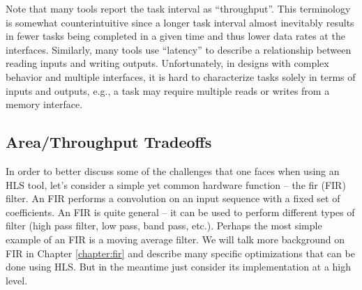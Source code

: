 \begin{aside}
Note that many tools report the task interval as ``throughput''. This terminology is somewhat counterintuitive since a longer task interval almost inevitably results in fewer tasks being completed in a given time and thus lower data rates at the interfaces.  Similarly, many tools use ``latency'' to describe a relationship between reading inputs and writing outputs.  Unfortunately, in designs with complex behavior and multiple interfaces, it is hard to characterize tasks solely in terms of inputs and outputs, e.g., a task may require multiple reads or writes from a memory interface. 
\end{aside}




\subsection{Area/Throughput Tradeoffs}
\label{sec:filterThroughputTradeoffs}

In order to better discuss some of the challenges that one faces when using an HLS tool, let's consider a simple yet common hardware function -- the \gls{fir} (FIR) filter. An FIR performs a convolution on an input sequence with a fixed set of coefficients. An FIR is quite general -- it can be used to perform different types of filter (high pass filter, low pass, band pass, etc.).  Perhaps the most simple example of an FIR is a moving average filter. We will talk more background on FIR in Chapter \ref{chapter:fir} and describe many specific optimizations that can be done using HLS. But in the meantime just consider its implementation at a high level. 

